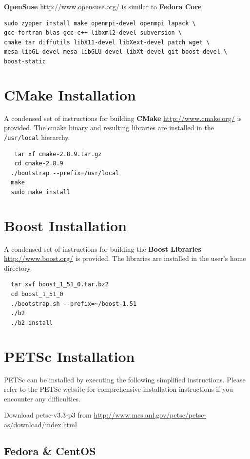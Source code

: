\documentclass[12pt]{article}
\begin{document}
\textbf{OpenSuse} \url{http://www.opensuse.org/} is similar to
\textbf{Fedora Core}

\begin{verbatim}
sudo zypper install make openmpi-devel openmpi lapack \
gcc-fortran blas gcc-c++ libxml2-devel subversion \ 
cmake tar diffutils libX11-devel libXext-devel patch wget \
mesa-libGL-devel mesa-libGLU-devel libXt-devel git boost-devel \
boost-static
\end{verbatim} 

\section{CMake Installation}

A condensed set of instructions for building \textbf{CMake}
\url{http://www.cmake.org/} is provided.  The cmake binary and
resulting libraries are installed in the \texttt{/usr/local} hierarchy.

\begin{verbatim}
   tar xf cmake-2.8.9.tar.gz 
   cd cmake-2.8.9
  ./bootstrap --prefix=/usr/local
  make
  sudo make install
\end{verbatim}

\section{Boost Installation}

A condensed set of instructions for building the \textbf{Boost
  Libraries} \url{http://www.boost.org/} is provided.  The libraries
are installed in the user's home directory.

\begin{verbatim}
  tar xvf boost_1_51_0.tar.bz2 
  cd boost_1_51_0
  ./bootstrap.sh --prefix=~/boost-1.51
  ./b2
  ./b2 install
\end{verbatim}

\section{PETSc Installation}

PETSc can be installed by executing the following simplified
instructions.  Please refer to the PETSc website for comprehensive
installation instructions if you encounter any difficulties.

Download petsc-v3.3-p3 from
\url{http://www.mcs.anl.gov/petsc/petsc-as/download/index.html}

\subsection{Fedora \& CentOS}
\end{document}
